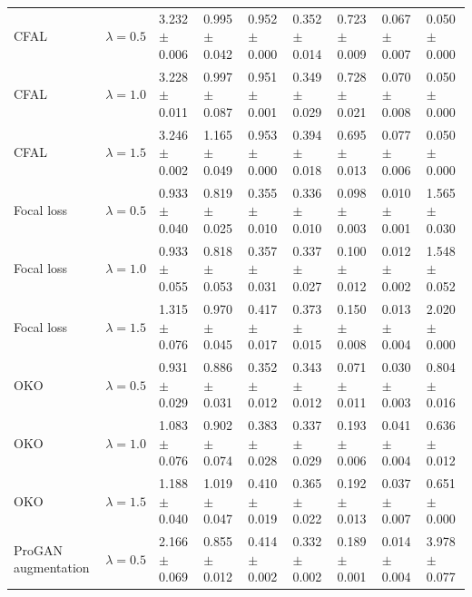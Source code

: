 \begin{tabular}{lllllllll}
CFAL & $\lambda=0.5$ & \num{3.232} $\pm$ \num{0.006} & \num{0.995} $\pm$ \num{0.042} & \num{0.952} $\pm$ \num{0.000} & \num{0.352} $\pm$ \num{0.014} & \num{0.723} $\pm$ \num{0.009} & \num{0.067} $\pm$ \num{0.007} & \num{0.050} $\pm$ \num{0.000}\\
CFAL & $\lambda=1.0$ & \num{3.228} $\pm$ \num{0.011} & \num{0.997} $\pm$ \num{0.087} & \num{0.951} $\pm$ \num{0.001} & \num{0.349} $\pm$ \num{0.029} & \num{0.728} $\pm$ \num{0.021} & \num{0.070} $\pm$ \num{0.008} & \num{0.050} $\pm$ \num{0.000}\\
CFAL & $\lambda=1.5$ & \num{3.246} $\pm$ \num{0.002} & \num{1.165} $\pm$ \num{0.049} & \num{0.953} $\pm$ \num{0.000} & \num{0.394} $\pm$ \num{0.018} & \num{0.695} $\pm$ \num{0.013} & \num{0.077} $\pm$ \num{0.006} & \num{0.050} $\pm$ \num{0.000}\\
Focal loss & $\lambda=0.5$ & \num{0.933} $\pm$ \num{0.040} & \num{0.819} $\pm$ \num{0.025} & \num{0.355} $\pm$ \num{0.010} & \num{0.336} $\pm$ \num{0.010} & \num{0.098} $\pm$ \num{0.003} & \num{0.010} $\pm$ \num{0.001} & \num{1.565} $\pm$ \num{0.030}\\
Focal loss & $\lambda=1.0$ & \num{0.933} $\pm$ \num{0.055} & \num{0.818} $\pm$ \num{0.053} & \num{0.357} $\pm$ \num{0.031} & \num{0.337} $\pm$ \num{0.027} & \num{0.100} $\pm$ \num{0.012} & \num{0.012} $\pm$ \num{0.002} & \num{1.548} $\pm$ \num{0.052}\\
Focal loss & $\lambda=1.5$ & \num{1.315} $\pm$ \num{0.076} & \num{0.970} $\pm$ \num{0.045} & \num{0.417} $\pm$ \num{0.017} & \num{0.373} $\pm$ \num{0.015} & \num{0.150} $\pm$ \num{0.008} & \num{0.013} $\pm$ \num{0.004} & \num{2.020} $\pm$ \num{0.000}\\
OKO & $\lambda=0.5$ & \num{0.931} $\pm$ \num{0.029} & \num{0.886} $\pm$ \num{0.031} & \num{0.352} $\pm$ \num{0.012} & \num{0.343} $\pm$ \num{0.012} & \num{0.071} $\pm$ \num{0.011} & \num{0.030} $\pm$ \num{0.003} & \num{0.804} $\pm$ \num{0.016}\\
OKO & $\lambda=1.0$ & \num{1.083} $\pm$ \num{0.076} & \num{0.902} $\pm$ \num{0.074} & \num{0.383} $\pm$ \num{0.028} & \num{0.337} $\pm$ \num{0.029} & \num{0.193} $\pm$ \num{0.006} & \num{0.041} $\pm$ \num{0.004} & \num{0.636} $\pm$ \num{0.012}\\
OKO & $\lambda=1.5$ & \num{1.188} $\pm$ \num{0.040} & \num{1.019} $\pm$ \num{0.047} & \num{0.410} $\pm$ \num{0.019} & \num{0.365} $\pm$ \num{0.022} & \num{0.192} $\pm$ \num{0.013} & \num{0.037} $\pm$ \num{0.007} & \num{0.651} $\pm$ \num{0.000}\\
ProGAN augmentation & $\lambda=0.5$ & \num{2.166} $\pm$ \num{0.069} & \num{0.855} $\pm$ \num{0.012} & \num{0.414} $\pm$ \num{0.002} & \num{0.332} $\pm$ \num{0.002} & \num{0.189} $\pm$ \num{0.001} & \num{0.014} $\pm$ \num{0.004} & \num{3.978} $\pm$ \num{0.077}\\

\end{tabular}
